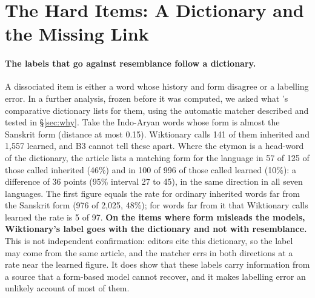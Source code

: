 \documentclass[11pt]{article}
\begin{document}
\section{The Hard Items: A Dictionary and the Missing Link}
\label{sec:link}

\paragraph{The labels that go against resemblance follow a dictionary.} A dissociated item is either a word whose history and form disagree or a labelling error. In a further analysis, frozen before it was computed, we asked what \citeauthor{turner1966cdial}'s comparative dictionary lists for them, using the automatic matcher described and tested in \S\ref{sec:why}. Take the Indo-Aryan words whose form is almost the Sanskrit form (distance at most 0.15). Wiktionary calls 141 of them inherited and 1,557 learned, and B3 cannot tell these apart. Where the etymon is a head-word of the dictionary, the article lists a matching form for the language in 57 of 125 of those called inherited (46\%) and in 100 of 996 of those called learned (10\%): a difference of 36 points (95\% interval 27 to 45), in the same direction in all seven languages. The first figure equals the rate for ordinary inherited words far from the Sanskrit form (976 of 2,025, 48\%); for words far from it that Wiktionary calls learned the rate is 5 of 97. \textbf{On the items where form misleads the models, Wiktionary's label goes with the dictionary and not with resemblance.} This is not independent confirmation: editors cite this dictionary, so the label may come from the same article, and the matcher errs in both directions at a rate near the learned figure. It does show that these labels carry information from a source that a form-based model cannot recover, and it makes labelling error an unlikely account of most of them.
\end{document}
